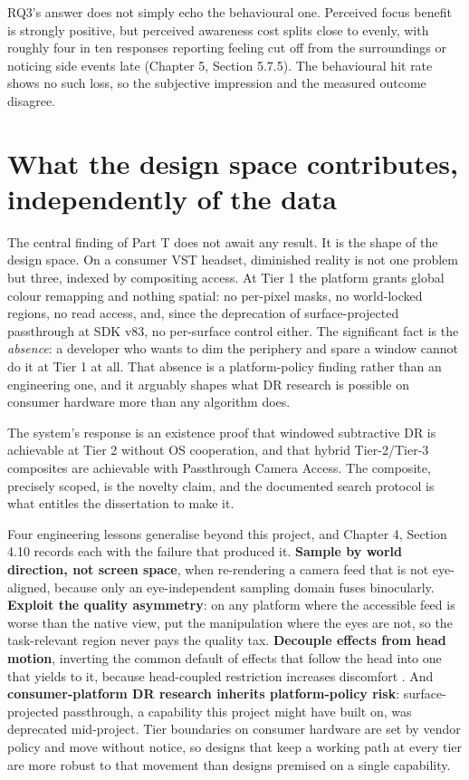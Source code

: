 RQ3's answer does not simply echo the behavioural one. Perceived focus benefit is strongly positive,
but perceived awareness cost splits close to evenly, with roughly four in ten responses reporting
feeling cut off from the surroundings or noticing side events late (Chapter 5, Section 5.7.5). The
behavioural hit rate shows no such loss, so the subjective impression and the measured outcome
disagree.

\section{What the design space contributes, independently of the data}

The central finding of Part T does not await any result. It is the shape of the design space. On a
consumer VST headset, diminished reality is not one problem but three, indexed by compositing access.
At Tier 1 the platform grants global colour remapping and nothing spatial: no per-pixel masks, no
world-locked regions, no read access, and, since the deprecation of surface-projected passthrough at
SDK v83, no per-surface control either. The significant fact is the \textit{absence}: a developer who
wants to dim the periphery and spare a window cannot do it at Tier 1 at all. That absence is a
platform-policy finding rather than an engineering one, and it arguably shapes what DR research is
possible on consumer hardware more than any algorithm does.

The system's response is an existence proof that windowed subtractive DR is achievable at Tier 2
without OS cooperation, and that hybrid Tier-2/Tier-3 composites are achievable with Passthrough
Camera Access. The composite, precisely scoped, is the novelty claim, and the documented search
protocol is what entitles the dissertation to make it.

Four engineering lessons generalise beyond this project, and Chapter 4, Section 4.10 records each
with the failure that produced it. \textbf{Sample by world direction, not screen space}, when
re-rendering a camera feed that is not eye-aligned, because only an eye-independent sampling domain fuses binocularly.
\textbf{Exploit the quality asymmetry}: on any platform where the accessible feed is worse than the
native view, put the manipulation where the eyes are not, so the task-relevant region never pays the
quality tax. \textbf{Decouple effects from head motion}, inverting the common default of effects that
follow the head into one that yields to it, because head-coupled restriction increases discomfort
\citep{norouzi2018}. And \textbf{consumer-platform DR research inherits platform-policy risk}:
surface-projected passthrough, a capability this project might have built on, was deprecated
mid-project. Tier boundaries on consumer hardware are set by vendor policy and move without notice,
so designs that keep a working path at every tier are more robust to that movement than designs
premised on a single capability.

